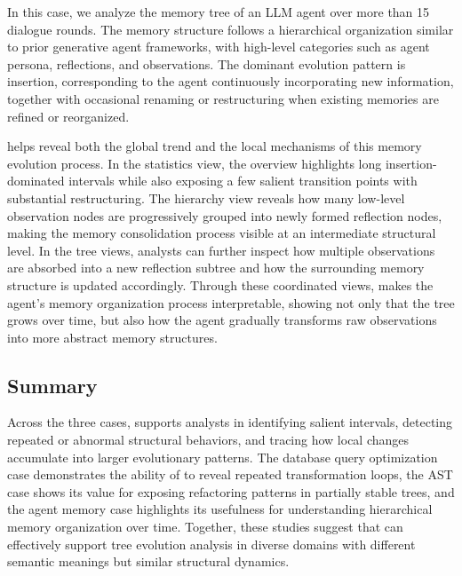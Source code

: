 In this case, we analyze the memory tree of an LLM agent over more than 15 dialogue rounds. The memory structure follows a hierarchical organization similar to prior generative agent frameworks, with high-level categories such as agent persona, reflections, and observations. The dominant evolution pattern is insertion, corresponding to the agent continuously incorporating new information, together with occasional renaming or restructuring when existing memories are refined or reorganized.

\sysname{} helps reveal both the global trend and the local mechanisms of this memory evolution process. In the statistics view, the overview highlights long insertion-dominated intervals while also exposing a few salient transition points with substantial restructuring. The hierarchy view reveals how many low-level observation nodes are progressively grouped into newly formed reflection nodes, making the memory consolidation process visible at an intermediate structural level. In the tree views, analysts can further inspect how multiple observations are absorbed into a new reflection subtree and how the surrounding memory structure is updated accordingly. Through these coordinated views, \sysname{} makes the agent's memory organization process interpretable, showing not only that the tree grows over time, but also how the agent gradually transforms raw observations into more abstract memory structures.

\subsection{Summary}

Across the three cases, \sysname{} supports analysts in identifying salient intervals, detecting repeated or abnormal structural behaviors, and tracing how local changes accumulate into larger evolutionary patterns. The database query optimization case demonstrates the ability of \sysname{} to reveal repeated transformation loops, the AST case shows its value for exposing refactoring patterns in partially stable trees, and the agent memory case highlights its usefulness for understanding hierarchical memory organization over time. Together, these studies suggest that \sysname{} can effectively support tree evolution analysis in diverse domains with different semantic meanings but similar structural dynamics.
